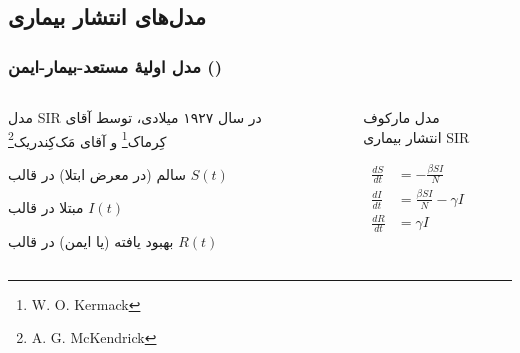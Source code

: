 \documentclass[xcolor=dvipsnames, professionalfonts, aspectratio=169, 11pt]{beamer}
\begin{document}
\subsection{مدل‌های انتشار بیماری}
\begin{frame}
    \frametitle{مدل اولیهٔ مستعد-بیمار-ایمن ()}

    \begin{columns}[onlytextwidth]
        \begin{column}{.5\textwidth}
            \begin{moredi}
                \item مدل SIR در سال ۱۹۲۷ میلادی، توسط آقای کِرماک\footnote[frame]{W. O. Kermack} و آقای مَک‌کِندریک\footnote[frame]{A. G. McKendrick}
                \begin{moredi}
                    \item سالم (در معرض ابتلا) در قالب $S(t)$
                    \item مبتلا در قالب $I(t)$
                    \item بهبود یافته (یا ایمن) در قالب $R(t)$
                \end{moredi}
            \end{moredi}
            \vspace{-1em}

        \end{column}
        \begin{column}{.5\textwidth}
            \begin{figure}
                \centering
                \caption{مدل مارکوف انتشار بیماری SIR}
                \label{fig:SIR}
            \end{figure}
            \begin{equation}
                \label{eqn:sir-ode-formulation}
                \begin{aligned}
                    {\frac {dS}{dt}} & =-{\frac {\beta SI}{N}}         \\
                    \frac {dI}{dt}   & ={\frac {\beta SI}{N}}-\gamma I \\
                    \frac {dR}{dt}   & =\gamma I
                \end{aligned}
            \end{equation}
        \end{column}
    \end{columns}

\end{frame}
\end{document}
